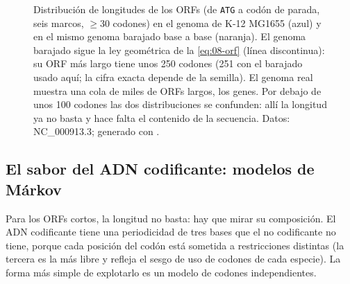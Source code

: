\begin{figure}[t]
\centering
{}
\caption[Longitud de los ORFs: genoma real frente a barajado]{Distribución de longitudes de los ORFs (de \texttt{ATG} a codón de parada, seis marcos, $\ge30$ codones) en el genoma de  K-12 MG1655 (azul) y en el mismo genoma barajado base a base (naranja). El genoma barajado sigue la ley geométrica de la \cref{eq:08-orf} (línea discontinua): su ORF más largo tiene unos 250 codones (251 con el barajado usado aquí; la cifra exacta depende de la semilla). El genoma real muestra una cola de miles de ORFs largos, los genes. Por debajo de unos 100 codones las dos distribuciones se confunden: allí la longitud ya no basta y hace falta el contenido de la secuencia. Datos: NC\_000913.3; generado con .}
\label{fig:08-orfs}
\end{figure}

\subsection{El sabor del ADN codificante: modelos de Márkov}

Para los ORFs cortos, la longitud no basta: hay que mirar su composición. El ADN codificante tiene una periodicidad de tres bases que el no codificante no tiene, porque cada posición del codón está sometida a restricciones distintas (la tercera es la más libre y refleja el sesgo de uso de codones de cada especie). La forma más simple de explotarlo es un modelo de codones independientes.

